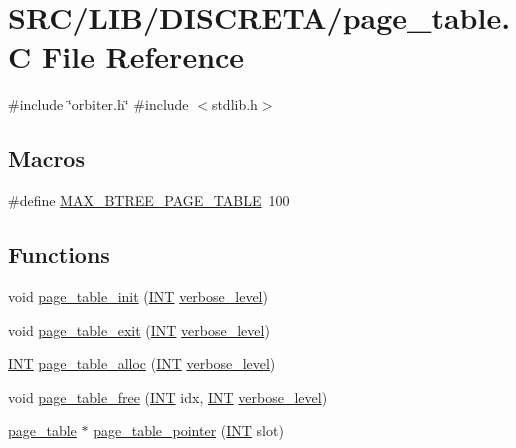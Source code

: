 \hypertarget{page__table_8_c}{}\section{S\+R\+C/\+L\+I\+B/\+D\+I\+S\+C\+R\+E\+T\+A/page\+\_\+table.C File Reference}
\label{page__table_8_c}
{\ttfamily \#include \char`\"{}orbiter.\+h\char`\"{}}\newline
{\ttfamily \#include $<$stdlib.\+h$>$}\newline
\subsection*{Macros}
\begin{DoxyCompactItemize}
\item 
\#define \mbox{\hyperlink{page__table_8_c_a7ff0ac91c6eeb18edae6105e1992146b}{M\+A\+X\+\_\+\+B\+T\+R\+E\+E\+\_\+\+P\+A\+G\+E\+\_\+\+T\+A\+B\+LE}}~100
\end{DoxyCompactItemize}
\subsection*{Functions}
\begin{DoxyCompactItemize}
\item 
void \mbox{\hyperlink{page__table_8_c_ab1c17c254db929b1c70f13c60f3efbbe}{page\+\_\+table\+\_\+init}} (\mbox{\hyperlink{galois_8h_a09fddde158a3a20bd2dcadb609de11dc}{I\+NT}} \mbox{\hyperlink{simeon_8_c_a818073fbcc2f439e7c56952f67386122}{verbose\+\_\+level}})
\item 
void \mbox{\hyperlink{page__table_8_c_acc70779efa7f6929db9236058a9fb20e}{page\+\_\+table\+\_\+exit}} (\mbox{\hyperlink{galois_8h_a09fddde158a3a20bd2dcadb609de11dc}{I\+NT}} \mbox{\hyperlink{simeon_8_c_a818073fbcc2f439e7c56952f67386122}{verbose\+\_\+level}})
\item 
\mbox{\hyperlink{galois_8h_a09fddde158a3a20bd2dcadb609de11dc}{I\+NT}} \mbox{\hyperlink{page__table_8_c_afbb04bcc679aa004c0bc9e0f34c7bf4c}{page\+\_\+table\+\_\+alloc}} (\mbox{\hyperlink{galois_8h_a09fddde158a3a20bd2dcadb609de11dc}{I\+NT}} \mbox{\hyperlink{simeon_8_c_a818073fbcc2f439e7c56952f67386122}{verbose\+\_\+level}})
\item 
void \mbox{\hyperlink{page__table_8_c_af9680c039a4c1b0deaf6446ea45882e4}{page\+\_\+table\+\_\+free}} (\mbox{\hyperlink{galois_8h_a09fddde158a3a20bd2dcadb609de11dc}{I\+NT}} idx, \mbox{\hyperlink{galois_8h_a09fddde158a3a20bd2dcadb609de11dc}{I\+NT}} \mbox{\hyperlink{simeon_8_c_a818073fbcc2f439e7c56952f67386122}{verbose\+\_\+level}})
\item 
\mbox{\hyperlink{classpage__table}{page\+\_\+table}} $\ast$ \mbox{\hyperlink{page__table_8_c_a53208086adbea2817fe45f917410d9d0}{page\+\_\+table\+\_\+pointer}} (\mbox{\hyperlink{galois_8h_a09fddde158a3a20bd2dcadb609de11dc}{I\+NT}} slot)
\end{DoxyCompactItemize}


